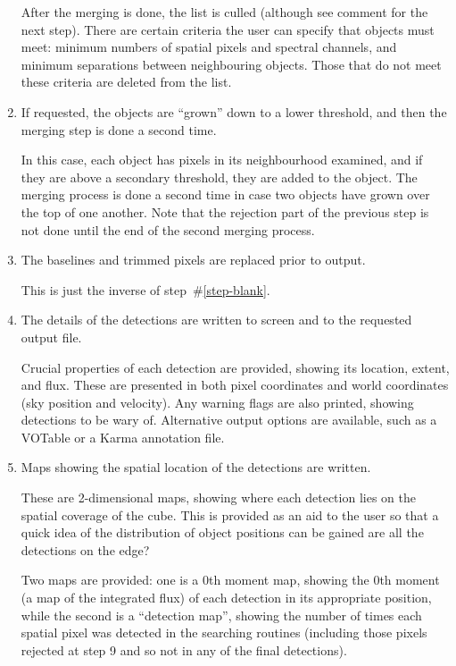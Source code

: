 \begin{enumerate}
  After the merging is done, the list is culled (although see comment
  for the next step). There are certain criteria the user can specify
  that objects must meet: minimum numbers of spatial pixels and
  spectral channels, and minimum separations between neighbouring
  objects. Those that do not meet these criteria are deleted
  from the list.

\item If requested, the objects are ``grown'' down to a lower
  threshold, and then the merging step is done a second time.

  In this case, each object has pixels in its neighbourhood examined,
  and if they are above a secondary threshold, they are added to the
  object. The merging process is done a second time in case two
  objects have grown over the top of one another. Note that the
  rejection part of the previous step is not done until the end of the
  second merging process.

\item The baselines and trimmed pixels are replaced prior to output.

  This is just the inverse of step~\#\ref{step-blank}.

\item The details of the detections are written to screen and to the
  requested output file.

  Crucial properties of each detection are provided, showing its
  location, extent, and flux. These are presented in both pixel
  coordinates and world coordinates (\eg sky position and
  velocity). Any warning flags are also printed, showing detections to
  be wary of. Alternative output options are available, such as a
  VOTable or a Karma annotation file.

\item Maps showing the spatial location of the detections are written.

  These are 2-dimensional maps, showing where each detection lies on
  the spatial coverage of the cube. This is provided as an aid to the
  user so that a quick idea of the distribution of object positions
  can be gained \eg are all the detections on the edge?

  Two maps are provided: one is a 0th moment map, showing the 0th
  moment (\ie a map of the integrated flux) of each detection in its
  appropriate position, while the second is a ``detection map'',
  showing the number of times each spatial pixel was detected in the
  searching routines (including those pixels rejected at step 9 and so
  not in any of the final detections).


\end{enumerate}
